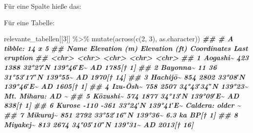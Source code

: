 \documentclass[
  ngerman,
]{article}
\newenvironment{Shaded}{\begin{snugshade}}{\end{snugshade}}
\newcommand{\AttributeTok}[1]{\textcolor[rgb]{0.77,0.63,0.00}{#1}}
\newcommand{\DecValTok}[1]{\textcolor[rgb]{0.00,0.00,0.81}{#1}}
\newcommand{\DocumentationTok}[1]{\textcolor[rgb]{0.56,0.35,0.01}{\textbf{\textit{#1}}}}
\newcommand{\FunctionTok}[1]{\textcolor[rgb]{0.00,0.00,0.00}{#1}}
\newcommand{\NormalTok}[1]{#1}
\newcommand{\SpecialCharTok}[1]{\textcolor[rgb]{0.00,0.00,0.00}{#1}}
\newcommand{\StringTok}[1]{\textcolor[rgb]{0.31,0.60,0.02}{#1}}
\begin{document}
Für eine Spalte hieße das:

\begin{Shaded}
\end{Shaded}

Für eine Tabelle:

\begin{Shaded}
\begin{Highlighting}[]
\NormalTok{relevante\_tabellen[[}\DecValTok{3}\NormalTok{]] }\SpecialCharTok{\%\textgreater{}\%}
  \FunctionTok{mutate}\NormalTok{(}\FunctionTok{across}\NormalTok{(}\FunctionTok{c}\NormalTok{(}\DecValTok{2}\NormalTok{, }\DecValTok{3}\NormalTok{), as.character))}
\DocumentationTok{\#\# \# A tibble: 14 x 5}
\DocumentationTok{\#\#    Name     \textasciigrave{}Elevation (m)\textasciigrave{} \textasciigrave{}Elevation (ft)\textasciigrave{} Coordinates        \textasciigrave{}Last eruption\textasciigrave{} }
\DocumentationTok{\#\#    \textless{}chr\textgreater{}    \textless{}chr\textgreater{}           \textless{}chr\textgreater{}            \textless{}chr\textgreater{}              \textless{}chr\textgreater{}           }
\DocumentationTok{\#\#  1 Aogashi\textasciitilde{} 423             1388             32°27′N 139°46′E﻿\textasciitilde{}  AD 1785[† 1]    }
\DocumentationTok{\#\#  2 Bayonna\textasciitilde{} 11              36               31°53′17″N 139°55\textasciitilde{} AD 1970[† 14]   }
\DocumentationTok{\#\#  3 Hachijō\textasciitilde{} 854             2802             33°08′N 139°46′E﻿\textasciitilde{}  AD 1605[† 1]    }
\DocumentationTok{\#\#  4 Izu{-}Ōsh\textasciitilde{} 758             2507             34°43′34″N 139°23\textasciitilde{} Mt. Mihara: AD \textasciitilde{}}
\DocumentationTok{\#\#  5 Kōzushi\textasciitilde{} 574             1877             34°13′N 139°09′E﻿\textasciitilde{}  AD 838[† 1]     }
\DocumentationTok{\#\#  6 Kurose   {-}110            {-}361             33°24′N 139°41′E﻿\textasciitilde{}  Caldera: older \textasciitilde{}}
\DocumentationTok{\#\#  7 Mikuraj\textasciitilde{} 851             2792             33°52′16″N 139°36\textasciitilde{} 6.3 ka BP[† 1]  }
\DocumentationTok{\#\#  8 Miyakej\textasciitilde{} 813             2674             34°05′10″N 139°31\textasciitilde{} AD 2013[† 16]   }

\end{Highlighting}
\end{Shaded}
\end{document}
